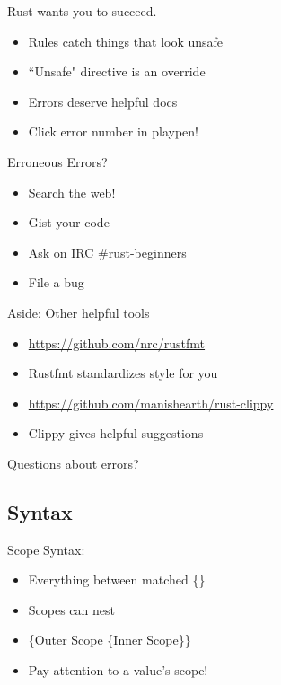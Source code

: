 \documentclass[aspectratio=169]{beamer}
\begin{document}
\begin{frame}
    Rust wants you to succeed.
    \begin{itemize}
        \item Rules catch things that look unsafe
        \item ``Unsafe" directive is an override
        \item Errors deserve helpful docs
        \item Click error number in playpen!
    \end{itemize}
\end{frame}

\begin{frame}
    Erroneous Errors?
    \begin{itemize}
        \item Search the web!
        \item Gist your code
        \item Ask on IRC \#rust-beginners
        \item File a bug
    \end{itemize}
\end{frame}

\begin{frame}
    Aside: Other helpful tools
    \begin{itemize}
        \item \url{https://github.com/nrc/rustfmt}
        \item Rustfmt standardizes style for you
        \item \url{https://github.com/manishearth/rust-clippy}
        \item Clippy gives helpful suggestions
    \end{itemize}
\end{frame}

\begin{frame}
    \hfill Questions about errors?
\end{frame}


\subsection{Syntax}

\begin{frame}
    Scope Syntax:
    \begin{itemize}
        \item Everything between matched \{\}
        \item Scopes can nest
        \item \{Outer Scope \{Inner Scope\}\}
        \item Pay attention to a value's scope!
    \end{itemize}
\end{frame}
\end{document}
